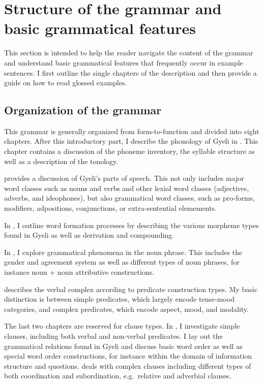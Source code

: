 



\section{Structure of the grammar and basic grammatical features}

This section is intended to help the reader navigate the content of the grammar and understand basic grammatical features that frequently occur in example sentences.  I first outline the single chapters of the description and then provide a guide on how to read glossed examples.


\subsection{Organization of the grammar}

This grammar is generally organized from form-to-function and divided into eight chapters. After this introductory part, I describe the phonology of Gyeli in . This chapter contains a discussion of the phoneme inventory, the syllable structure as well as a description of the tonology.

 provides a discussion of Gyeli's parts of speech. This not only includes major word classes such as nouns and verbs and other lexial word classes (adjectives, adverbs, and ideophones), but also grammatical word classes, such as pro-forms, modifiers, adpositions, conjunctions, or extra-sentential elemements.

In , I outline word formation processes by describing the various morpheme types found in Gyeli as well as derivation and compounding.

In , I explore grammatical phenomena in the noun phrase. This includes the gender and agreement system as well as different types of noun phrases, for instance noun + noun attributive constructions.

 describes the verbal complex according to predicate construction types. My basic distinction is between simple predicates, which largely encode tense-mood categories, and complex predicates, which encode aspect, mood, and modality.

The last two chapters are reserved for clause types. In , I investigate simple clauses, including both verbal and non-verbal predicates. I lay out the grammatical relations found in Gyeli and discuss basic word order as well as special word order constructions, for instance within the domain of information structure and questions.  deals with complex clauses including different types of both coordination and subordination, e.g.\ relative and adverbial clauses. 

